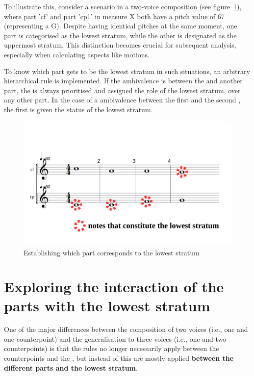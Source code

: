 To illustrate this, consider a scenario in a two-voice composition (see figure~\ref{fig:one-voice-max-can-be-a}), where part 'cf' and part 'cp1' in measure X both have a pitch value of 67 (representing a G). Despite having identical pitches at the same moment, one part is categorised as the lowest stratum, while the other is designated as the uppermost stratum. This distinction becomes crucial for subsequent analysis, especially when calculating aspects like motions.

To know which part gets to be the lowest stratum in such situations, an arbitrary hierarchical rule is implemented. If the ambivalence is between the \cfs and another part, the \cfs is always prioritised and assigned the role of the lowest stratum, over any other part. In the case of a ambivalence between the first \cps and the second \cp, the first \cps is given the status of the lowest stratum. 

\begin{figure}[h]
    \centering
    \includegraphics[width=.5\textwidth]{Images/one-voice-max-can-be-a.png}
    \caption{Establishing which part corresponds to the lowest stratum}
    \label{fig:one-voice-max-can-be-a}
  \end{figure}

\section{Exploring the interaction of the parts with the lowest stratum} \label{exploring-interaction-p-a}

One of the major differences between the composition of two voices (i.e., one \cfs and one counterpoint) and the generalisation to three voices (i.e., one \cfs and two counterpoints) is that the rules no longer necessarily apply between the counterpoints and the \cf, but instead of this are mostly applied \textbf{between the different parts and the lowest stratum}. 

